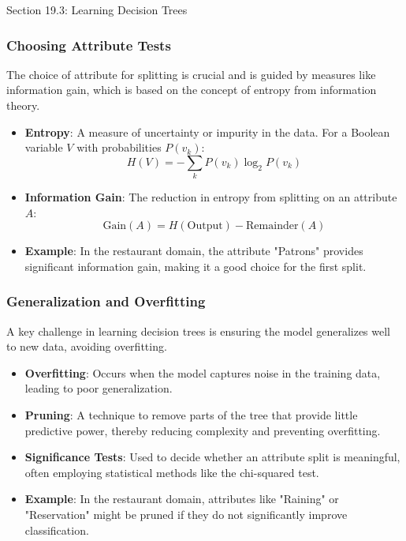 \begin{notes}{Section 19.3: Learning Decision Trees}
\begin{highlight}
    \end{highlight}
    
    \subsubsection*{Choosing Attribute Tests}
    
    The choice of attribute for splitting is crucial and is guided by measures like information gain, which is based on the concept of entropy from information theory.
    
    \begin{highlight}
    
        \begin{itemize}
            \item \textbf{Entropy}: A measure of uncertainty or impurity in the data. For a Boolean variable $V$ with probabilities $P(v_k)$:
            \[
            H(V) = -\sum_k P(v_k) \log_2 P(v_k)
            \]
            \item \textbf{Information Gain}: The reduction in entropy from splitting on an attribute $A$:
            \[
            \text{Gain}(A) = H(\text{Output}) - \text{Remainder}(A)
            \]
            \item \textbf{Example}: In the restaurant domain, the attribute "Patrons" provides significant information gain, making it a good choice for the first split.
        \end{itemize}
    
    \end{highlight}
    
    \subsubsection*{Generalization and Overfitting}
    
    A key challenge in learning decision trees is ensuring the model generalizes well to new data, avoiding overfitting.
    
    \begin{highlight}
    
        \begin{itemize}
            \item \textbf{Overfitting}: Occurs when the model captures noise in the training data, leading to poor generalization.
            \item \textbf{Pruning}: A technique to remove parts of the tree that provide little predictive power, thereby reducing complexity and preventing overfitting.
            \item \textbf{Significance Tests}: Used to decide whether an attribute split is meaningful, often employing statistical methods like the chi-squared test.
            \item \textbf{Example}: In the restaurant domain, attributes like "Raining" or "Reservation" might be pruned if they do not significantly improve classification.
        \end{itemize}
    

\end{highlight}
\end{notes}
